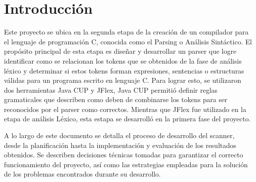 \documentclass[a4paper,12pt]{article}
\begin{document}
\section*{Introducción}
\begin{flushleft}
	\hspace*{2em} Este proyecto se ubica en la segunda etapa de la creación de un compilador para el lenguaje de programación C, conocida como el Parsing o Análisis Sintáctico. El propósito principal de esta etapa es diseñar y desarrollar un parser que logre identificar como se relacionan los tokens que se obtenidos de la fase de análisis léxico y determinar si estos tokens forman expresiones, sentencias o estructuras válidas para un programa escrito en lenguaje C. Para lograr esto, se utilizaron dos herramientas Java CUP y JFlex, Java CUP permitió definir reglas gramaticales que describen como deben de combinarse los tokens para ser reconocidos por el parser como correctos. Mientras que JFlex fue utilizado en la etapa de análisis Léxico, esta estapa se desarrolló en la primera fase del proyecto. \par
\vspace{1em}
\hspace*{2em} A lo largo de este documento se detalla el proceso de desarrollo 
del scanner, desde la planificación hasta la implementación y evaluación de los
resultados obtenidos. Se describen decisiones técnicas tomadas para garantizar el
correcto funcionamiento del proyecto, así como las estrategias empleadas para la 
solución de los problemas encontrados durante su desarrollo. 

\end{flushleft}

\end{document}
